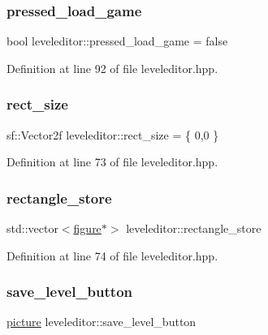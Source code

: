 \subsubsection{\texorpdfstring{pressed\+\_\+load\+\_\+game}{pressed\_load\_game}}
{\footnotesize\ttfamily bool leveleditor\+::pressed\+\_\+load\+\_\+game = false\hspace{0.3cm}{\ttfamily [private]}}



Definition at line 92 of file leveleditor.\+hpp.

\mbox{\label{classleveleditor_a520e15cb7a61acba59ccd36a951479e5}} 
\subsubsection{\texorpdfstring{rect\+\_\+size}{rect\_size}}
{\footnotesize\ttfamily sf\+::\+Vector2f leveleditor\+::rect\+\_\+size = \{ 0,0 \}\hspace{0.3cm}{\ttfamily [private]}}



Definition at line 73 of file leveleditor.\+hpp.

\mbox{\label{classleveleditor_a07af571a23c704edfe87baef71265597}} 
\subsubsection{\texorpdfstring{rectangle\+\_\+store}{rectangle\_store}}
{\footnotesize\ttfamily std\+::vector$<$\hyperlink{classfigure}{figure}$\ast$$>$ leveleditor\+::rectangle\+\_\+store\hspace{0.3cm}{\ttfamily [private]}}



Definition at line 74 of file leveleditor.\+hpp.

\mbox{\label{classleveleditor_ac05afa3b3ddd67cc6be6df6a43f1526f}} 
\subsubsection{\texorpdfstring{save\+\_\+level\+\_\+button}{save\_level\_button}}
{\footnotesize\ttfamily \hyperlink{classpicture}{picture} leveleditor\+::save\+\_\+level\+\_\+button\hspace{0.3cm}{\ttfamily [private]}}



